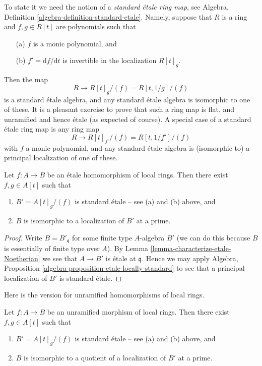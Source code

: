 \medskip\noindent
To state it we need the notion of a {\it standard \'etale ring map}, see
Algebra, Definition \ref{algebra-definition-standard-etale}.
Namely, suppose that $R$ is a ring and $f, g \in R[t]$ are polynomials
such that
\begin{enumerate}
\item[(a)] $f$ is a monic polynomial, and
\item[(b)] $f' = \text{d}f/\text{d}t$ is invertible in the localization
$R[t]_g$.
\end{enumerate}
Then the map
$$
R \longrightarrow R[t]_g/(f) = R[t, 1/g]/(f)
$$
is a standard \'etale algebra, and any standard \'etale algebra is isomorphic
to one of these. It is a pleasant exercise to prove that such a ring map
is flat, and unramified and hence \'etale (as expected of course).
A special case of a standard \'etale ring map is any ring map
$$
R \longrightarrow R[t]_{f'}/(f) = R[t, 1/f']/(f)
$$
with $f$ a monic polynomial, and any standard \'etale algebra is (isomorphic to)
a principal localization of one of these.

\begin{theorem}
\label{theorem-structure-etale}
Let $f : A \to B$ be an \'etale homomorphism of local rings.
Then there exist $f, g \in A[t]$ such that
\begin{enumerate}
\item $B' = A[t]_g/(f)$ is standard \'etale -- see (a) and (b) above, and
\item $B$ is isomorphic to a localization of $B'$ at a prime.
\end{enumerate}
\end{theorem}

\begin{proof}
Write $B = B'_{\mathfrak q}$ for some finite type $A$-algebra $B'$
(we can do this because $B$ is essentially of finite type over $A$).
By Lemma \ref{lemma-characterize-etale-Noetherian}
we see that $A \to B'$ is \'etale at $\mathfrak q$.
Hence we may apply
Algebra, Proposition \ref{algebra-proposition-etale-locally-standard}
to see that a principal localization of $B'$ is standard \'etale.
\end{proof}

\noindent
Here is the version for unramified homomorphisms of local rings.

\begin{theorem}
\label{theorem-structure-unramified}
Let $f : A \to B$ be an unramified morphism of local rings.
Then there exist $f, g \in A[t]$ such that
\begin{enumerate}
\item $B' = A[t]_g/(f)$ is standard \'etale -- see (a) and (b) above, and
\item $B$ is isomorphic to a quotient of a localization of $B'$ at a prime.
\end{enumerate}
\end{theorem}

